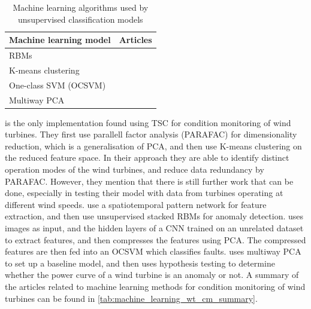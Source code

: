 \begin{table}[h]
    \centering
    \begin{tabular}{p{}p{}}
        \toprule
        Machine learning model & Articles \\
        \midrule
        RBMs                    & \cite{unsup_graphical_modeling_wt_cm} \\
        K-means clustering      & \cite{fault_detect_PARAFAC_k_means} \\
        One-class SVM (OCSVM)   & \cite{unsupervised_AD_blade_damage_deep_features_images} \\
        Multiway PCA            & \cite{multiway_PCA_multivar_inference_cm_wt} \\
        \bottomrule
    \end{tabular}
    \caption{Machine learning algorithms used by unsupervised classification models}
    \label{tab:sup_classification_ml_models}
\end{table}

\textcite{fault_detect_PARAFAC_k_means} is the only implementation found using TSC for condition monitoring of wind turbines. 
They first use parallell factor analysis (PARAFAC) for dimensionality reduction, which is a generalisation of PCA, and then use K-means clustering on the reduced feature space. 
In their approach they are able to identify distinct operation modes of the wind turbines, and reduce data redundancy by PARAFAC. 
However, they mention that there is still further work that can be done, especially in testing their model with data from turbines operating at different wind speeds. 
\textcite{unsup_graphical_modeling_wt_cm} use a spatiotemporal pattern network for feature extraction, and then use unsupervised stacked RBMs for anomaly detection. 
\textcite{unsupervised_AD_blade_damage_deep_features_images} uses images as input, and the hidden layers of a CNN trained on an unrelated dataset to extract features, and then compresses the features using PCA. 
The compressed features are then fed into an OCSVM which classifies faults. 
\textcite{multiway_PCA_multivar_inference_cm_wt} uses multiway PCA to set up a baseline model, and then uses hypothesis testing to determine whether the power curve of a wind turbine is an anomaly or not. 
A summary of the articles related to machine learning methods for condition monitoring of wind turbines can be found in \ref{tab:machine_learning_wt_cm_summary}.

